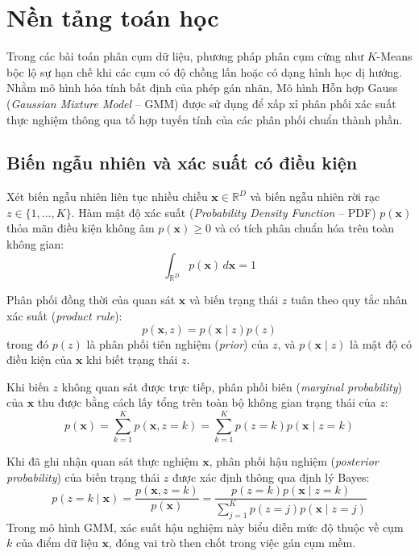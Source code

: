 \documentclass[12pt,a4paper]{article}
\newcommand{\vx}{\mathbf{x}}
\newcommand{\R}{\mathbb{R}}
\begin{document}
\section{Nền tảng toán học}
\label{sec:math_foundations}

Trong các bài toán phân cụm dữ liệu, phương pháp phân cụm cứng như $K$-Means bộc lộ sự hạn chế khi các cụm có độ chồng lấn hoặc có dạng hình học dị hướng. Nhằm mô hình hóa tính bất định của phép gán nhãn, Mô hình Hỗn hợp Gauss (\textit{Gaussian Mixture Model} -- GMM) được sử dụng để xấp xỉ phân phối xác suất thực nghiệm thông qua tổ hợp tuyến tính của các phân phối chuẩn thành phần. 

\subsection{Biến ngẫu nhiên và xác suất có điều kiện}
\label{subsec:prob_basics}

Xét biến ngẫu nhiên liên tục nhiều chiều $\vx \in \R^D$ và biến ngẫu nhiên rời rạc $z \in \{1, \dots, K\}$. Hàm mật độ xác suất (\textit{Probability Density Function} -- PDF) $p(\vx)$ thỏa mãn điều kiện không âm $p(\vx) \ge 0$ và có tích phân chuẩn hóa trên toàn không gian:
\begin{equation}
    \int_{\R^D} p(\vx)\, d\vx = 1
\end{equation}

Phân phối đồng thời của quan sát $\vx$ và biến trạng thái $z$ tuân theo quy tắc nhân xác suất (\textit{product rule}):
\begin{equation}
    p(\vx, z) = p(\vx \mid z) p(z)
\end{equation}
trong đó $p(z)$ là phân phối tiên nghiệm (\textit{prior}) của $z$, và $p(\vx \mid z)$ là mật độ có điều kiện của $\vx$ khi biết trạng thái $z$.

Khi biến $z$ không quan sát được trực tiếp, phân phối biên (\textit{marginal probability}) của $\vx$ thu được bằng cách lấy tổng trên toàn bộ không gian trạng thái của $z$:
\begin{equation}
    p(\vx) = \sum_{k=1}^K p(\vx, z=k) = \sum_{k=1}^K p(z=k) p(\vx \mid z=k)
\end{equation}

Khi đã ghi nhận quan sát thực nghiệm $\vx$, phân phối hậu nghiệm (\textit{posterior probability}) của biến trạng thái $z$ được xác định thông qua định lý Bayes:
\begin{equation}
    p(z=k \mid \vx) = \frac{p(\vx, z=k)}{p(\vx)} = \frac{p(z=k) p(\vx \mid z=k)}{\sum_{j=1}^K p(z=j) p(\vx \mid z=j)} \label{eq:bayes_rule}
\end{equation}
Trong mô hình GMM, xác suất hậu nghiệm này biểu diễn mức độ thuộc về cụm $k$ của điểm dữ liệu $\vx$, đóng vai trò then chốt trong việc gán cụm mềm.
\end{document}
